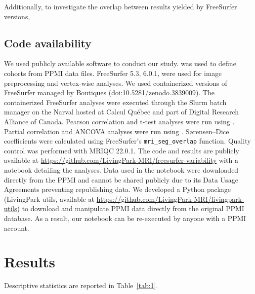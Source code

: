 \documentclass[11pt]{article}
\begin{document}
Additionally, to investigate the overlap between results yielded by FreeSurfer versions, 

\subsection{Code availability}

We used publicly available software to conduct our study.  was used to define cohorts from PPMI
data files. FreeSurfer 5.3, 6.0.1,  were used for image preprocessing and vertex-wise
analyses. We used containerized versions of FreeSurfer managed by Boutiques 
(doi:10.5281/zenodo.3839009). The containerized FreeSurfer analyses were executed through the Slurm batch manager
on the Narval  hosted at Calcul Québec and
part of Digital Research Alliance of Canada. Pearson correlation and t-test analyses were run using . Partial correlation and ANCOVA analyses were run using
. Sørensen--Dice coefficients were calculated using FreeSurfer's \texttt{mri\_seg\_overlap}
function. Quality control was performed with MRIQC 22.0.1. 
The code and results are publicly available at \url{https://github.com/LivingPark-MRI/freesurfer-variability} with a
notebook detailing the analyses. Data used in the notebook were downloaded directly from the PPMI and cannot be
shared publicly due to its Data Usage Agreements preventing republishing data. We developed a Python package
(LivingPark utils, available at \url{https://github.com/LivingPark-MRI/livingpark-utils}) to download and manipulate
PPMI data directly from the original PPMI database. As a result, our notebook can be re-executed by anyone with a
PPMI account.

\section{Results}

 Descriptive statistics are reported in
Table~\ref{tab:1}.
\end{document}
